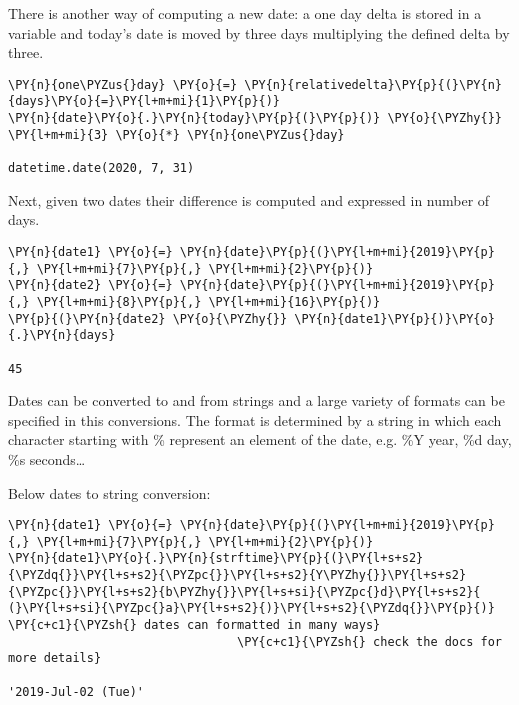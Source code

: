 There is another way of computing a new date: a one day delta is stored in a variable 
and today's date is moved by three days multiplying the defined delta by three.

\begin{codebox}
\begin{Verbatim}[commandchars=\\\{\}]
\PY{n}{one\PYZus{}day} \PY{o}{=} \PY{n}{relativedelta}\PY{p}{(}\PY{n}{days}\PY{o}{=}\PY{l+m+mi}{1}\PY{p}{)}
\PY{n}{date}\PY{o}{.}\PY{n}{today}\PY{p}{(}\PY{p}{)} \PY{o}{\PYZhy{}} \PY{l+m+mi}{3} \PY{o}{*} \PY{n}{one\PYZus{}day}

datetime.date(2020, 7, 31)
\end{Verbatim}
\end{codebox}

Next, given two dates their difference is computed and expressed in number of days.

\begin{codebox}
\begin{Verbatim}[commandchars=\\\{\}]
\PY{n}{date1} \PY{o}{=} \PY{n}{date}\PY{p}{(}\PY{l+m+mi}{2019}\PY{p}{,} \PY{l+m+mi}{7}\PY{p}{,} \PY{l+m+mi}{2}\PY{p}{)}
\PY{n}{date2} \PY{o}{=} \PY{n}{date}\PY{p}{(}\PY{l+m+mi}{2019}\PY{p}{,} \PY{l+m+mi}{8}\PY{p}{,} \PY{l+m+mi}{16}\PY{p}{)}
\PY{p}{(}\PY{n}{date2} \PY{o}{\PYZhy{}} \PY{n}{date1}\PY{p}{)}\PY{o}{.}\PY{n}{days}

45
\end{Verbatim}
\end{codebox}

Dates can be converted to and from strings and a large variety of formats can be specified in this conversions. 
The format is determined by a string in which each character starting with \% represent an element 
of the date, e.g. \%Y year, \%d day, \%s seconds\ldots

Below dates to string conversion:

\begin{codebox}
\begin{Verbatim}[commandchars=\\\{\}]
\PY{n}{date1} \PY{o}{=} \PY{n}{date}\PY{p}{(}\PY{l+m+mi}{2019}\PY{p}{,} \PY{l+m+mi}{7}\PY{p}{,} \PY{l+m+mi}{2}\PY{p}{)}
\PY{n}{date1}\PY{o}{.}\PY{n}{strftime}\PY{p}{(}\PY{l+s+s2}{\PYZdq{}}\PY{l+s+s2}{\PYZpc{}}\PY{l+s+s2}{Y\PYZhy{}}\PY{l+s+s2}{\PYZpc{}}\PY{l+s+s2}{b\PYZhy{}}\PY{l+s+si}{\PYZpc{}d}\PY{l+s+s2}{ (}\PY{l+s+si}{\PYZpc{}a}\PY{l+s+s2}{)}\PY{l+s+s2}{\PYZdq{}}\PY{p}{)} \PY{c+c1}{\PYZsh{} dates can formatted in many ways}
                                \PY{c+c1}{\PYZsh{} check the docs for more details}

'2019-Jul-02 (Tue)'
\end{Verbatim}
\end{codebox}

